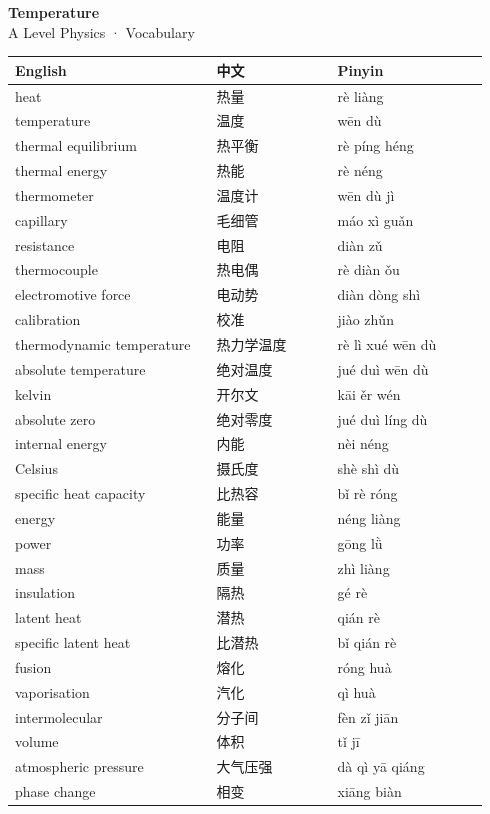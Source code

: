 \documentclass[11pt]{article}
\begin{document}
\begin{center}
  {\LARGE\bfseries Temperature}\\[0.35em]
  {\large A Level Physics · Vocabulary}
\end{center}
\vspace{0.6em}

\begin{longtable}{@{}p{0.40\linewidth}p{0.24\linewidth}p{0.30\linewidth}@{}}
\toprule
\textbf{English} & \textbf{中文} & \textbf{Pinyin} \\
\midrule
\endhead
\bottomrule
\endlastfoot
heat & 热量 & rè liàng \\
temperature & 温度 & wēn dù \\
thermal equilibrium & 热平衡 & rè píng héng \\
thermal energy & 热能 & rè néng \\
thermometer & 温度计 & wēn dù jì \\
capillary & 毛细管 & máo xì guǎn \\
resistance & 电阻 & diàn zǔ \\
thermocouple & 热电偶 & rè diàn ǒu \\
electromotive force & 电动势 & diàn dòng shì \\
calibration & 校准 & jiào zhǔn \\
thermodynamic temperature & 热力学温度 & rè lì xué wēn dù \\
absolute temperature & 绝对温度 & jué duì wēn dù \\
kelvin & 开尔文 & kāi ěr wén \\
absolute zero & 绝对零度 & jué duì líng dù \\
internal energy & 内能 & nèi néng \\
Celsius & 摄氏度 & shè shì dù \\
specific heat capacity & 比热容 & bǐ rè róng \\
energy & 能量 & néng liàng \\
power & 功率 & gōng lǜ \\
mass & 质量 & zhì liàng \\
insulation & 隔热 & gé rè \\
latent heat & 潜热 & qián rè \\
specific latent heat & 比潜热 & bǐ qián rè \\
fusion & 熔化 & róng huà \\
vaporisation & 汽化 & qì huà \\
intermolecular & 分子间 & fèn zǐ jiān \\
volume & 体积 & tǐ jī \\
atmospheric pressure & 大气压强 & dà qì yā qiáng \\
phase change & 相变 & xiāng biàn \\
\end{longtable}
\end{document}
